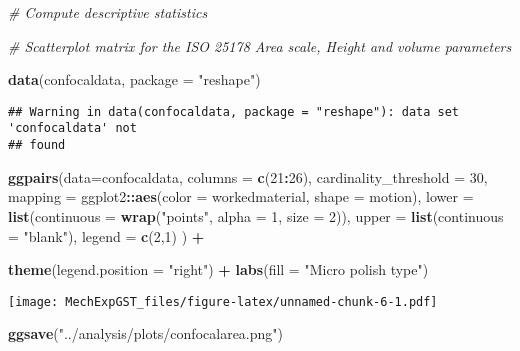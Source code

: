 \documentclass[
]{article}
\newenvironment{Shaded}{\begin{snugshade}}{\end{snugshade}}
\newcommand{\CommentTok}[1]{\textcolor[rgb]{0.56,0.35,0.01}{\textit{#1}}}
\newcommand{\DataTypeTok}[1]{\textcolor[rgb]{0.13,0.29,0.53}{#1}}
\newcommand{\DecValTok}[1]{\textcolor[rgb]{0.00,0.00,0.81}{#1}}
\newcommand{\KeywordTok}[1]{\textcolor[rgb]{0.13,0.29,0.53}{\textbf{#1}}}
\newcommand{\NormalTok}[1]{#1}
\newcommand{\OperatorTok}[1]{\textcolor[rgb]{0.81,0.36,0.00}{\textbf{#1}}}
\newcommand{\StringTok}[1]{\textcolor[rgb]{0.31,0.60,0.02}{#1}}
\begin{document}
\begin{Shaded}
\begin{Highlighting}[]
\CommentTok{# Compute descriptive statistics}

\CommentTok{# Scatterplot matrix for the ISO 25178 Area scale, Height and volume parameters}

\KeywordTok{data}\NormalTok{(confocaldata, }\DataTypeTok{package =} \StringTok{"reshape"}\NormalTok{)}
\end{Highlighting}
\end{Shaded}

\begin{verbatim}
## Warning in data(confocaldata, package = "reshape"): data set 'confocaldata' not
## found
\end{verbatim}

\begin{Shaded}
\begin{Highlighting}[]
\KeywordTok{ggpairs}\NormalTok{(}\DataTypeTok{data=}\NormalTok{confocaldata,}
        \DataTypeTok{columns =} \KeywordTok{c}\NormalTok{(}\DecValTok{21}\OperatorTok{:}\DecValTok{26}\NormalTok{),}
        \DataTypeTok{cardinality_threshold =} \DecValTok{30}\NormalTok{,}
        \DataTypeTok{mapping =}\NormalTok{ ggplot2}\OperatorTok{::}\KeywordTok{aes}\NormalTok{(}\DataTypeTok{color =}\NormalTok{ workedmaterial, }\DataTypeTok{shape =}\NormalTok{ motion),}
        \DataTypeTok{lower =} \KeywordTok{list}\NormalTok{(}\DataTypeTok{continuous =} \KeywordTok{wrap}\NormalTok{(}\StringTok{"points"}\NormalTok{, }\DataTypeTok{alpha =} \DecValTok{1}\NormalTok{, }\DataTypeTok{size =} \DecValTok{2}\NormalTok{)),}
        \DataTypeTok{upper =} \KeywordTok{list}\NormalTok{(}\DataTypeTok{continuous =} \StringTok{"blank"}\NormalTok{),}
        \DataTypeTok{legend =} \KeywordTok{c}\NormalTok{(}\DecValTok{2}\NormalTok{,}\DecValTok{1}\NormalTok{)}
\NormalTok{        ) }\OperatorTok{+}

\StringTok{    }\KeywordTok{theme}\NormalTok{(}\DataTypeTok{legend.position =} \StringTok{"right"}\NormalTok{) }\OperatorTok{+}
\StringTok{  }\KeywordTok{labs}\NormalTok{(}\DataTypeTok{fill =} \StringTok{"Micro polish type"}\NormalTok{)}
\end{Highlighting}
\end{Shaded}

\texttt{[image: MechExpGST\_files/figure-latex/unnamed-chunk-6-1.pdf]}

\begin{Shaded}
\begin{Highlighting}[]
\KeywordTok{ggsave}\NormalTok{(}\StringTok{"../analysis/plots/confocalarea.png"}\NormalTok{)}
\end{Highlighting}
\end{Shaded}
\end{document}
